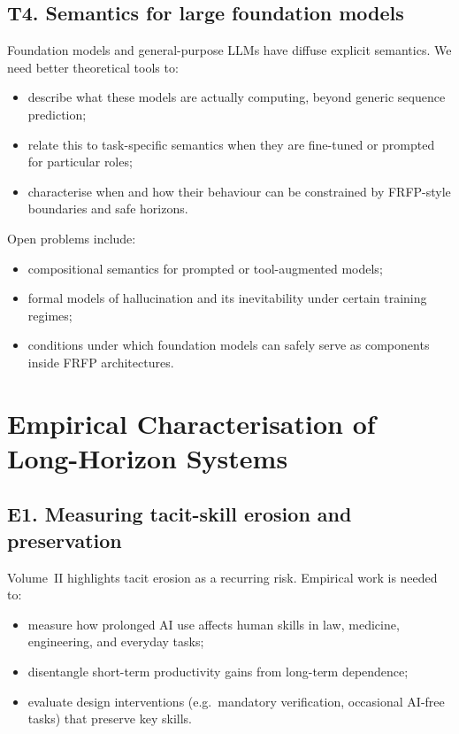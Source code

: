 \subsection{T4. Semantics for large foundation models}

Foundation models and general-purpose LLMs have diffuse explicit
semantics.
We need better theoretical tools to:

\begin{itemize}
  \item describe what these models are actually computing, beyond
        generic sequence prediction;
  \item relate this to task-specific semantics when they are
        fine-tuned or prompted for particular roles;
  \item characterise when and how their behaviour can be constrained
        by FRFP-style boundaries and safe horizons.
\end{itemize}

Open problems include:

\begin{itemize}
  \item compositional semantics for prompted or tool-augmented
        models;
  \item formal models of hallucination and its inevitability under
        certain training regimes;
  \item conditions under which foundation models can safely serve as
        components inside FRFP architectures.
\end{itemize}

\section{Empirical Characterisation of Long-Horizon Systems}

\subsection{E1. Measuring tacit-skill erosion and preservation}

Volume~II highlights tacit erosion as a recurring risk.
Empirical work is needed to:

\begin{itemize}
  \item measure how prolonged AI use affects human skills in law,
        medicine, engineering, and everyday tasks;
  \item disentangle short-term productivity gains from long-term
        dependence;
  \item evaluate design interventions (e.g.\ mandatory verification,
        occasional AI-free tasks) that preserve key skills.
\end{itemize}

